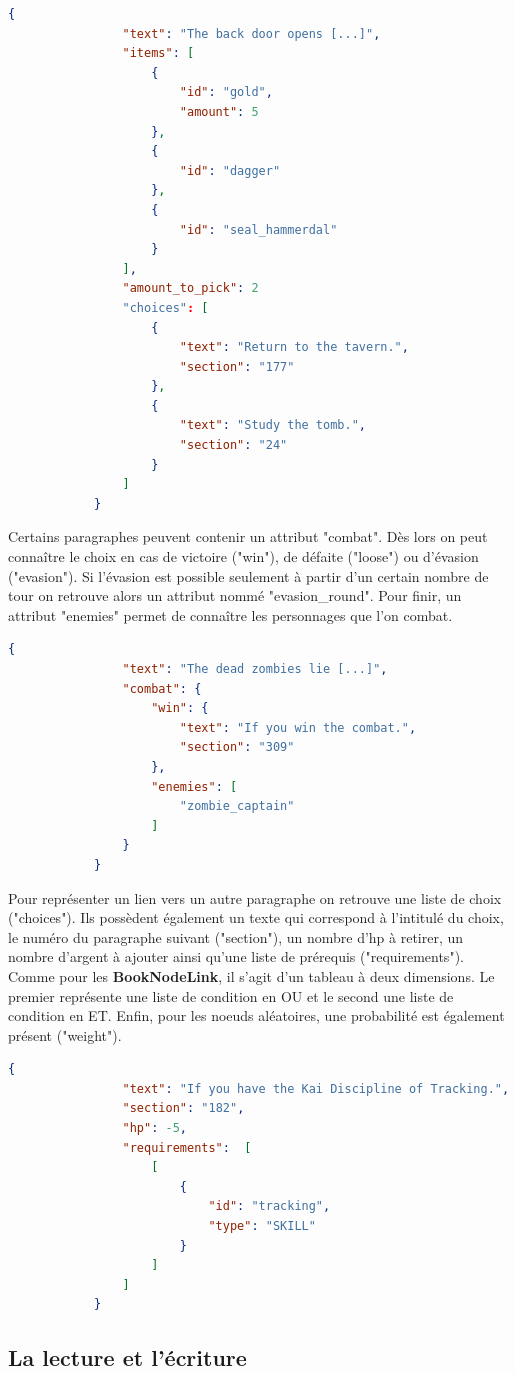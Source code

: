 			\begin{lstlisting}[gobble=12, language=json, caption=Exemple de paragraphe]
			{
				"text": "The back door opens [...]",
				"items": [
					{
						"id": "gold",
						"amount": 5
					},
					{
						"id": "dagger"
					},
					{
						"id": "seal_hammerdal"
					}
				],
				"amount_to_pick": 2
				"choices": [
					{
						"text": "Return to the tavern.",
						"section": "177"
					},
					{
						"text": "Study the tomb.",
						"section": "24"
					}
				]
			}
			\end{lstlisting}

			Certains paragraphes peuvent contenir un attribut "combat". Dès lors on peut connaître le choix en cas de victoire ("win"), de défaite ("loose") ou d'évasion ("evasion"). Si l'évasion est possible seulement à partir d'un certain nombre de tour on retrouve alors un attribut nommé "evasion\_round". Pour finir, un attribut "enemies" permet de connaître les personnages que l'on combat.

			\begin{lstlisting}[gobble=12, language=json, caption=Exemple de paragraphe avec des combats]
			{
				"text": "The dead zombies lie [...]",
				"combat": {
					"win": {
						"text": "If you win the combat.",
						"section": "309"
					},
					"enemies": [
						"zombie_captain"
					]
				}
			}
			\end{lstlisting}

			Pour représenter un lien vers un autre paragraphe on retrouve une liste de choix ("choices"). Ils possèdent également un texte qui correspond à l'intitulé du choix, le numéro du paragraphe suivant ("section"), un nombre d'hp à retirer, un nombre d'argent à ajouter ainsi qu'une liste de prérequis ("requirements"). Comme pour les \textbf{BookNodeLink}, il s'agit d'un tableau à deux dimensions. Le premier représente une liste de condition en OU et le second une liste de condition en ET. Enfin, pour les noeuds aléatoires, une probabilité est également présent ("weight").

			\begin{lstlisting}[gobble=12, language=json, caption=Exemple de choix]
			{
				"text": "If you have the Kai Discipline of Tracking.",
				"section": "182",
				"hp": -5,
				"requirements":  [
					[
						{
							"id": "tracking",
							"type": "SKILL"
						}
					]
				]
			}
			\end{lstlisting}

		\subsection{La lecture et l'écriture}
			\label{subsec:lecture_ecriture_fichier}

